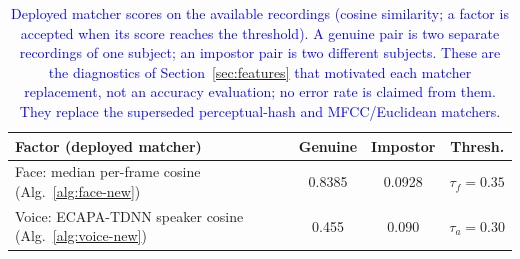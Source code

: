\documentclass[10pt,journal,compsoc]{IEEEtran}
\begin{document}
\begin{table}[!htbp]
\caption{\textcolor{blue}{Deployed matcher scores on the available recordings (cosine similarity; a factor is accepted when its score reaches the threshold). A genuine pair is two separate recordings of one subject; an impostor pair is two different subjects. These are the diagnostics of Section~\ref{sec:features} that motivated each matcher replacement, not an accuracy evaluation; no error rate is claimed from them. They replace the superseded perceptual-hash and MFCC/Euclidean matchers.}}
\label{tab:scores}
\centering
{\small
\begin{tabular}{|p{3.05cm}|c|c|c|}
\hline
\textbf{Factor (deployed matcher)} & \textbf{Genuine} & \textbf{Impostor} & \textbf{Thresh.} \\ \hline
Face: median per-frame cosine (Alg.~\ref{alg:face-new}) & 0.8385 & 0.0928 & $\tau_f{=}0.35$ \\ \hline
Voice: ECAPA-TDNN speaker cosine (Alg.~\ref{alg:voice-new}) & 0.455 & 0.090 & $\tau_a{=}0.30$ \\ \hline
\end{tabular}}
\end{table}
\end{document}
